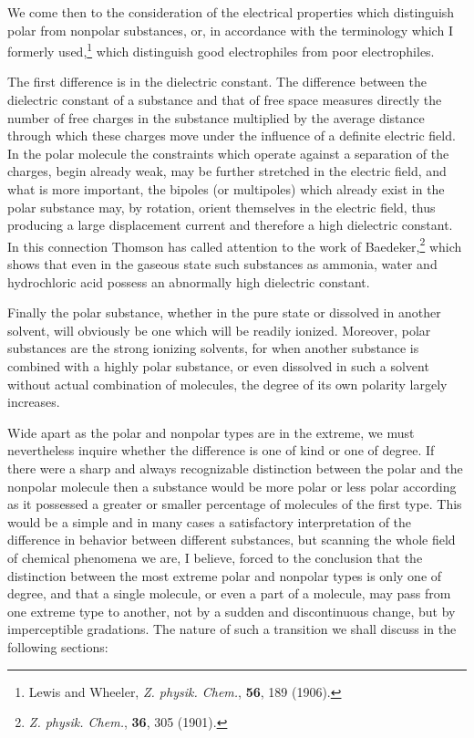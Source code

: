 \documentclass[11pt]{memoir}
\begin{document}
We come then to the consideration of the electrical properties which distinguish polar from nonpolar substances, or, in accordance with the terminology which I formerly used,\footnote{Lewis and Wheeler, \emph{Z. physik. Chem.}, \textbf{56}, 189 (1906).} which distinguish good electrophiles from poor electrophiles.

The first difference is in the dielectric constant.  The difference between the dielectric constant of a substance and that of free space measures directly the number of free charges in the substance multiplied by the average distance through which these charges move under the influence of a definite electric field.  In the polar molecule the constraints which operate against a separation of the charges, begin already weak, may be further stretched in the electric field, and what is more important, the bipoles (or multipoles) which already exist in the polar substance may, by rotation, orient themselves in the electric field, thus producing a large displacement current and therefore a high dielectric constant.  In this connection Thomson has called attention to the work of Baedeker,\footnote{\emph{Z. physik. Chem.}, \textbf{36}, 305 (1901).} which shows that even in the gaseous state such substances as ammonia, water and hydrochloric acid possess an abnormally high dielectric constant.

Finally the polar substance, whether in the pure state or dissolved in another solvent, will obviously be one which will be readily ionized.  Moreover, polar substances are the strong ionizing solvents, for when another substance is combined with a highly polar substance, or even dissolved in such a solvent without actual combination of molecules, the degree of its own polarity largely increases.

Wide apart as the polar and nonpolar types are in the extreme, we must nevertheless inquire whether the difference is one of kind or one of degree. If there were a sharp and always recognizable distinction between the polar and the nonpolar molecule then a substance would be more polar or less polar according as it possessed a greater or smaller percentage of molecules of the first type.  This would be a simple and in many cases a satisfactory interpretation of the difference in behavior between different substances, but scanning the whole field of chemical phenomena we are, I believe, forced to the conclusion that the distinction between the most extreme polar and nonpolar types is only one of degree, and that a single molecule, or even a part of a molecule, may pass from one extreme type to another, not by a sudden and discontinuous change, but by imperceptible gradations.  The nature of such a transition we shall discuss in the following sections:
\end{document}
